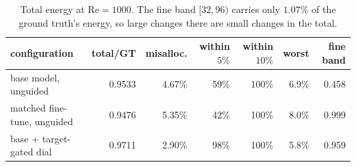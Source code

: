 \begin{table}[t]
  \centering
  \caption{Total energy at $\mathrm{Re}=1000$. The fine band $[32,96)$ carries only $1.07\%$ of the ground truth's energy, so large changes there are small changes in the total.}
  \label{tab:re1000-total}
  \begin{tabular}{lrrrrrr}
    \toprule
    configuration & total/GT & misalloc. & within $5\%$ & within $10\%$ & worst & fine band \\
    \midrule
    base model, unguided & 0.9533 & 4.67\% & 59\% & 100\% & 6.9\% & 0.458 \\
    matched fine-tune, unguided & 0.9476 & 5.35\% & 42\% & 100\% & 8.0\% & 0.999 \\
    base + target-gated dial & 0.9711 & 2.90\% & 98\% & 100\% & 5.8\% & 0.959 \\
    \bottomrule
  \end{tabular}
\end{table}

